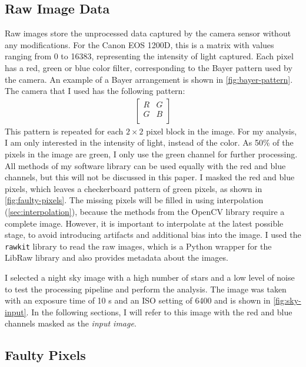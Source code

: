 \subsection{Raw Image Data}
\label{sec:raw-image-data}

Raw images store the unprocessed data captured by the camera sensor without any
modifications. For the Canon EOS 1200D, this is a matrix with values ranging from 0 to
16383, representing the intensity of light captured. Each pixel has a red, green or blue
color filter, corresponding to the Bayer pattern used by the camera. An example of a Bayer
arrangement is shown in \autoref{fig:bayer-pattern}. The camera that I used has the
following pattern:
\begin{align*}
  \begin{bmatrix}
    R & G \\
    G & B \\
  \end{bmatrix}
\end{align*}
This pattern is repeated for each $2 \times 2$ pixel block in the image. For my analysis,
I am only interested in the intensity of light, instead of the color. As 50\% of the
pixels in the image are green, I only use the green channel for further processing. All
methods of my software library can be used equally with the red and blue channels, but
this will not be discussed in this paper. I masked the red and blue pixels, which leaves a
checkerboard pattern of green pixels, as shown in \autoref{fig:faulty-pixels}. The missing
pixels will be filled in using interpolation (\autoref{sec:interpolation}), because the
methods from the OpenCV library require a complete image. However, it is important to
interpolate at the latest possible stage, to avoid introducing artifacts and additional
bias into the image. I used the \texttt{rawkit} library \cite{rawkit2025} to read the raw
images, which is a Python wrapper for the LibRaw library and also provides metadata about
the images.

I selected a night sky image with a high number of stars and a low level of noise to test
the processing pipeline and perform the analysis. The image was taken with an exposure
time of 10 s and an ISO setting of 6400 and is shown in \autoref{fig:sky-input}. In the
following sections, I will refer to this image with the red and blue channels masked as
the \textit{input image}.

\subsection{Faulty Pixels}
\label{sec:faulty-pixels}

